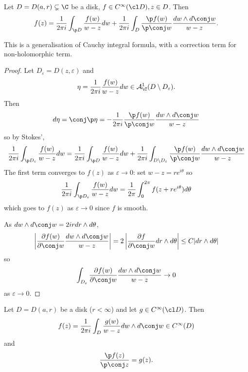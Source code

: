 \documentclass[a4paper]{article}
\newcommand{\w}{\wedge} %
\begin{document}
\begin{proposition}
  Let \(D = D(a, r) \subsetneq \C\) be a disk, \(f \in C^\infty(\cl D), z \in D\). Then
  \[
    f(z) = \frac{1}{2\pi i} \int_{\p D}\frac{f(w)}{w - z} dw + \frac{1}{2\pi i} \int_D \frac{\p f(w)}{\p \conj w} \frac{dw \w d \conj w}{w - z}.
  \]
\end{proposition}
This is a generalisation of Cauchy integral formula, with a correction term for non-holomorphic term.

\begin{proof}
  Let \(D_\varepsilon = D(z, \varepsilon)\) and
  \[
    \eta = \frac{1}{2\pi i} \frac{f(w)}{w - z} dw \in \mathcal A_\C^1 (D \setminus D_\varepsilon).
  \]
  Then
  \[
    d\eta
    = \conj \p \eta
    = -\frac{1}{2\pi i} \frac{\p f(w)}{\p \conj w} \frac{d w \w d \conj w}{w - z}
  \]
  so by Stokes',
  \[
    \frac{1}{2\pi i} \int_{\p D_\varepsilon} \frac{f(w)}{w - z} dw
    = \frac{1}{2\pi i} \int_{\p D} \frac{f(w)}{w - z} dw + \frac{1}{2\pi i} \int_{D \setminus D_\varepsilon} \frac{\p f(w)}{\p \conj w} \frac{dw \w d \conj w}{w - z}
  \]
  The first term converges to \(f(z)\) as \(\varepsilon \to 0\): set \(w - z = re^{i\theta}\) so
  \[
    \frac{1}{2\pi i} \int_{\p D_\varepsilon} \frac{f(w)}{w - z} dw
    = \frac{1}{2\pi} \int_0^{2\pi} f(z + re^{i\theta}) d\theta
  \]
  which goes to \(f(z)\) as \(\varepsilon \to 0\) since \(f\) is smooth.

  As \(dw \w d \conj w = 2ir dr \w d \theta\),
  \[
    \left| \frac{\partial f(w)}{\partial \conj w}  \frac{dw \w d \conj w}{w - z} \right|
    = 2 \left| \frac{\partial f}{\partial \conj w} dr \w d\theta \right|
    \leq C |dr \w d\theta|
  \]
  so
  \[
    \int_{D_\varepsilon} \frac{\partial f(w)}{\partial \conj w} \frac{dw \w d \conj w}{w - z}
    \to 0
  \]
  as \(\varepsilon \to 0\).
\end{proof}

\begin{theorem}
  Let \(D = D(a, r)\) be a disk (\(r < \infty\)) and let \(g \in C^\infty(\cl D)\). Then
  \[
    f(z) = \frac{1}{2\pi i} \int_D \frac{g(w)}{w - z} dw \w d \conj w \in C^\infty(D)
  \]
  and
  \[
    \frac{\p f(z)}{\p \conj z} = g(z).
  \]
\end{theorem}
\end{document}

